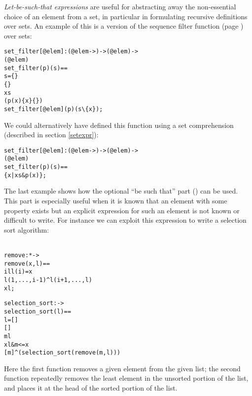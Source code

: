\documentclass[\pformat,12pt]{article}
\begin{document}
\begin{description}
  {\it Let-be-such-that expressions} are useful for abstracting away
  the non-essential choice of an element from a set, in particular in
  formulating recursive definitions over sets. An example of this is a
  version of the sequence filter function (page \pageref{filterdef})
  over sets:\label{setfilterdef}
  \begin{alltt}
    set_filter[@elem] : (@elem -> ) -> ( @elem) -> 
                        ( @elem)
    set_filter(p)(s) ==
       s = \{\}
       \{\}
       x  s
           ( p(x)  \{x\}  \{\}) 
             set_filter[@elem](p)(s \verb+\+ \{x\});
   \end{alltt}
   We could alternatively have defined this function using a set
  comprehension (described in section \ref{setexpr}):
  \begin{alltt}
    set_filter[@elem] : (@elem -> ) -> ( @elem) -> 
                        ( @elem)
    set_filter(p)(s) ==
      \{ x | x  s & p(x)\};
  \end{alltt} 

   The last example shows how the optional ``be such that'' part
   () can be used. This part is especially useful when it
   is known that an element with some property exists but an explicit
   expression for such an element is not known or difficult to
  write. For instance we can exploit this expression to write a
  selection sort algorithm:
   \begin{alltt}\label{selectionSortdef}
   remove :  *  -> 
   remove (x,l) ==
      i  l  l(i) = x
      l(1,...,i-1)\verb+^+l(i+1,..., l)
    x  l;

   selection_sort :  -> 
   selection_sort (l) ==
      l = []
      []
      m  l 
          x  l & m <= x
          [m]\verb+^+(selection_sort (remove(m,l)))
   \end{alltt}
   Here the first function removes a given element from the given
   list; the second function repeatedly removes the least element in
   the unsorted portion of the list, and places it at the head of the
   sorted portion of the list.
\end{description}
\end{document}
